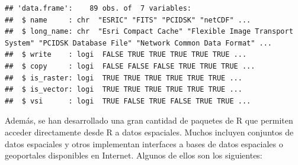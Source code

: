 \documentclass[
  spanish,
]{book}
\theoremstyle{break}
\theoremstyle{definition}
\theoremstyle{definition}
\theoremstyle{definition}
\theoremstyle{definition}
\theoremstyle{remark}
\begin{document}
\begin{verbatim}
## 'data.frame':    89 obs. of  7 variables:
##  $ name     : chr  "ESRIC" "FITS" "PCIDSK" "netCDF" ...
##  $ long_name: chr  "Esri Compact Cache" "Flexible Image Transport System" "PCIDSK Database File" "Network Common Data Format" ...
##  $ write    : logi  FALSE TRUE TRUE TRUE TRUE TRUE ...
##  $ copy     : logi  FALSE FALSE FALSE TRUE TRUE TRUE ...
##  $ is_raster: logi  TRUE TRUE TRUE TRUE TRUE TRUE ...
##  $ is_vector: logi  TRUE TRUE TRUE TRUE TRUE TRUE ...
##  $ vsi      : logi  TRUE FALSE TRUE FALSE TRUE TRUE ...
\end{verbatim}

Además, se han desarrollado una gran cantidad de paquetes de R que permiten acceder directamente desde R a datos espaciales.
Muchos incluyen conjuntos de datos espaciales y otros implementan interfaces a bases de datos espaciales o geoportales disponibles en Internet.
Algunos de ellos son los siguientes:
\end{document}
